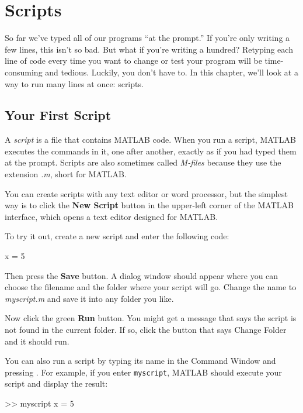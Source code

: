 \chapter{Scripts}

So far we've typed all of our programs ``at the prompt.'' If you're only writing a few lines, this isn't so bad. But what if you're writing a hundred? Retyping each line of code every time you want to change or test your program will be time-consuming and tedious. Luckily, you don't have to. In this chapter, we'll look at a way to run many lines at once: scripts.


\section{Your First Script}

A \emph{script} is a file that contains MATLAB code. When you run a script, MATLAB executes the commands in it, one after another, exactly as if you had typed them at the prompt. Scripts are
also sometimes called \emph{M-files} because they use the extension \emph{.m}, short for MATLAB.


You can create scripts with any text editor or word processor, but the simplest way is to click the \textbf{New Script} button in the upper-left corner of the MATLAB interface, which opens a text editor designed for MATLAB.

To try it out, create a new script and enter the following code:

\begin{code}
x = 5
\end{code}

Then press the \textbf{Save} button.  A dialog window should appear where you can choose the filename and the folder where your script will go.
Change the name to \emph{myscript.m} and save it into any folder you like.

Now click the green \textbf{Run} button.  You might get a message that says the script is not found in the current folder.
If so, click the button that says Change Folder and it should run.


You can also run a script by typing its name in the Command Window and pressing . For example, if you enter \lstinline{myscript}, MATLAB should execute your script and display the result:

\begin{code}
>> myscript
x = 5
\end{code}


